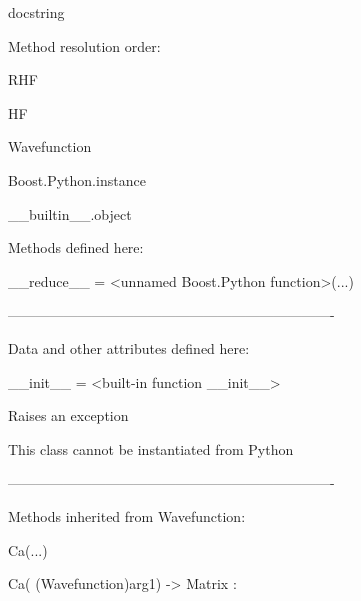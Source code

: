 \documentclass[letterpaper,10pt,english]{sphinxmanual}
\begin{document}
\begin{description}
\begin{description}
\item[{class RHF(HF, Wavefunction)}] \leavevmode
\begin{DUlineblock}{0em}
\item[] docstring
\item[] 
\item[] Method resolution order:
\item[]
\begin{DUlineblock}{\DUlineblockindent}
\item[] RHF
\item[] HF
\item[] Wavefunction
\item[] Boost.Python.instance
\item[] \_\_builtin\_\_.object
\item[] 
\end{DUlineblock}
\item[] Methods defined here:
\item[] 
\item[] \_\_reduce\_\_ = \textless{}unnamed Boost.Python function\textgreater{}(...)
\item[] 
\item[] ----------------------------------------------------------------------
\item[] Data and other attributes defined here:
\item[] 
\item[] \_\_init\_\_ = \textless{}built-in function \_\_init\_\_\textgreater{}
\item[]
\begin{DUlineblock}{\DUlineblockindent}
\item[] Raises an exception
\item[] This class cannot be instantiated from Python
\item[] 
\end{DUlineblock}
\item[] ----------------------------------------------------------------------
\item[] Methods inherited from Wavefunction:
\item[] 
\item[] Ca(...)
\item[]
\begin{DUlineblock}{\DUlineblockindent}
\item[] Ca( (Wavefunction)arg1) -\textgreater{} Matrix :
\item[]
\begin{DUlineblock}{\DUlineblockindent}

\end{DUlineblock}
\end{DUlineblock}
\end{DUlineblock}
\end{description}
\end{description}
\end{document}

